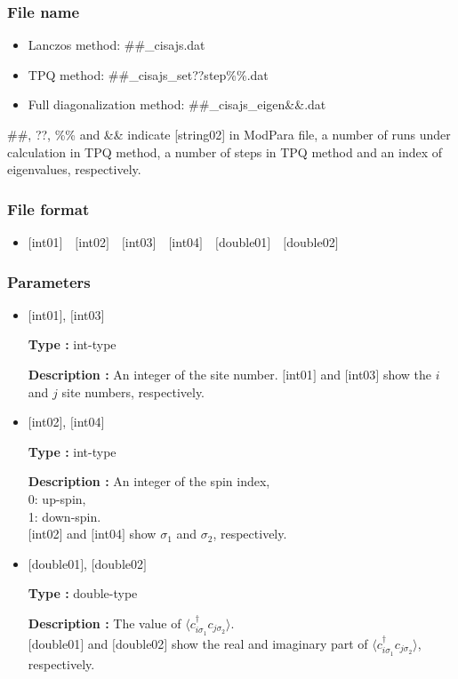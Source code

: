 \subsubsection{File name}
 \begin{itemize}
   \item{Lanczos method:}  \#\#\_cisajs.dat
   \item{TPQ method:} \#\#\_cisajs\_set??step\%\%.dat
   \item{Full diagonalization method:}  \#\#\_cisajs\_eigen{\&\&}.dat
  \end{itemize}
  \#\#, ??, \%\% and \&\& indicate [string02] in ModPara file, a number of runs under calculation in TPQ method, a number of steps in TPQ method and an index of eigenvalues, respectively.


\subsubsection{File format}
 \begin{itemize}
   \item  $[$int01$]$~~$[$int02$]$~~$[$int03$]$~~$[$int04$]$~~$[$double01$]$~~$[$double02$]$
  \end{itemize}
\subsubsection{Parameters}
 \begin{itemize}

  \item  $[$int01$]$, $[$int03$]$

 {\bf Type :} int-type

{\bf Description :} An integer of the site number. $[$int01$]$ and $[$int03$]$ show the $i$ and $j$ site numbers, respectively.
 
  \item  $[$int02$]$, $[$int04$]$

 {\bf Type :} int-type 

{\bf Description :} An integer of the spin index,\\
   0: up-spin,\\
   1: down-spin.\\ 
$[$int02$]$ and $[$int04$]$ show $\sigma_1$ and $\sigma_2$, respectively. \\

  \item  $[$double01$]$, $[$double02$]$

 {\bf Type :} double-type 

{\bf Description :} The value of $\langle c_{i\sigma_1}^{\dagger}c_{j\sigma_2}\rangle$.\\
$[$double01$]$ and $[$double02$]$ show the real and imaginary part of $\langle c_{i\sigma_1}^{\dagger}c_{j\sigma_2}\rangle$, respectively.
\end{itemize}

